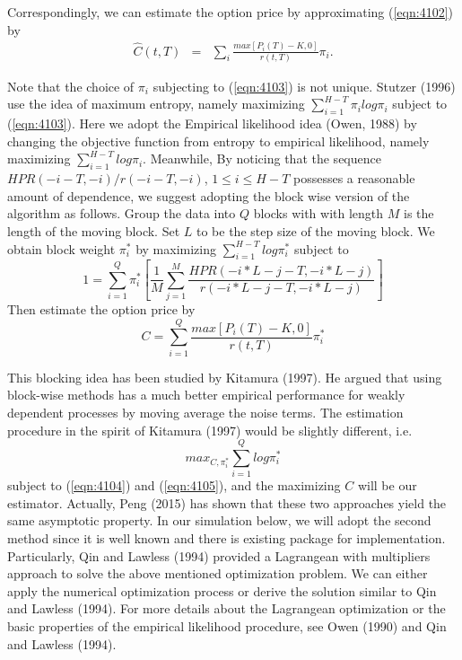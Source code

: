 Correspondingly, we can estimate the option price by approximating (\ref{eqn:4102}) by
\begin{eqnarray}
\hat{C}(t,T)&=& \sum_{i} \frac{max[P_i(T)-K,0]}{r(t,T)}  \pi_i.
\end{eqnarray}

Note that the choice of $\pi_i$ subjecting to (\ref{eqn:4103}) is not unique. Stutzer (1996) use the idea of maximum entropy, namely maximizing $\sum^{H-T}_{i=1}\pi_ilog\pi_i$ subject to (\ref{eqn:4103}). Here we adopt the Empirical likelihood idea (Owen, 1988) by changing the objective function from entropy to empirical likelihood, namely maximizing $\sum^{H-T}_{i=1}log\pi_i$. Meanwhile, By noticing that the sequence $HPR(-i-T,-i)/r(-i-T,-i)$, $1\leq i\leq H-T$ possesses a reasonable amount of dependence, we suggest  adopting the block wise version of the algorithm as follows. Group the data into $Q$ blocks with with length $M$ is the length of the moving block. Set $L$ to be the step size of the moving block. We obtain block weight $\pi^*_i$ by maximizing $\sum_{i=1}^{H-T} log\pi_i^*$ subject to 
\begin{equation}\label{eqn:4104}
1=\sum_{i=1}^{Q} \pi^*_i \left[\frac{1}{M} \sum_{j=1}^M \frac{HPR(-i*L-j-T, -i*L-j)}{r(-i*L-j-T, -i*L-j)}\right]
\end{equation} 
Then estimate the option price by 
\begin{equation}\label{eqn:4105}
C  =  \sum_{i=1}^Q \frac{max[P_i(T)-K,0]}{r(t,T)}  \pi^*_i
\end{equation} 


This blocking idea has been studied by Kitamura (1997). He argued that using block-wise methods has a much better empirical performance for weakly dependent processes by moving average the noise terms. The estimation procedure in the spirit of Kitamura (1997) would be slightly different, i.e. 
\begin{equation}
max_{C, \pi_i^*} \sum_{i=1}^{Q} log\pi_i^*
\end{equation}
subject to (\ref{eqn:4104}) and  (\ref{eqn:4105}), and the maximizing $C$ will be our estimator. Actually, Peng (2015) has shown that these two approaches yield the same asymptotic property. In our simulation below, we will adopt the second method since it is well known and there is existing package for implementation. Particularly, Qin and Lawless (1994) provided a Lagrangean with multipliers approach to solve the above mentioned optimization problem. We can either apply the numerical optimization process or derive the solution similar to Qin and Lawless (1994). For more details about the Lagrangean optimization or the basic properties of the empirical likelihood procedure, see Owen (1990) and Qin and Lawless (1994). 
  

